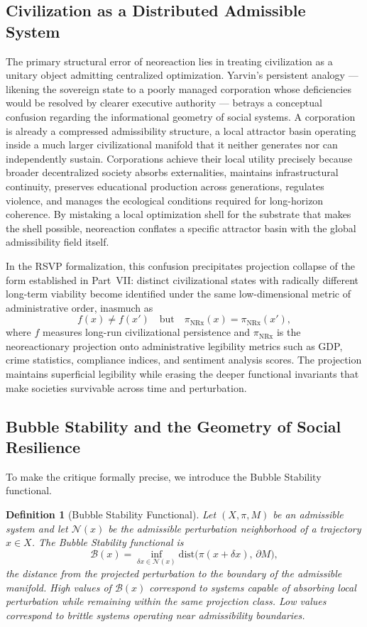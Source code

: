 \documentclass[12pt, a4paper]{article}
\theoremstyle{essaystyle}
\newtheorem{definition}{Definition}
\begin{document}
\subsection{Civilization as a Distributed Admissible System}

The primary structural error of neoreaction lies in treating civilization as a
unitary object admitting centralized optimization. Yarvin's persistent analogy ---
likening the sovereign state to a poorly managed corporation whose deficiencies
would be resolved by clearer executive authority --- betrays a conceptual confusion
regarding the informational geometry of social systems. A corporation is already
a compressed admissibility structure, a local attractor basin operating inside a
much larger civilizational manifold that it neither generates nor can independently
sustain. Corporations achieve their local utility precisely because broader
decentralized society absorbs externalities, maintains infrastructural continuity,
preserves educational production across generations, regulates violence, and manages
the ecological conditions required for long-horizon coherence. By mistaking a local
optimization shell for the substrate that makes the shell possible, neoreaction
conflates a specific attractor basin with the global admissibility field itself.

In the RSVP formalization, this confusion precipitates projection collapse of the
form established in Part~VII: distinct civilizational states with radically different
long-term viability become identified under the same low-dimensional metric of
administrative order, inasmuch as
\[
f(x) \neq f(x') \quad \text{but} \quad \pi_{\mathrm{NRx}}(x) = \pi_{\mathrm{NRx}}(x'),
\]
where $f$ measures long-run civilizational persistence and $\pi_{\mathrm{NRx}}$ is
the neoreactionary projection onto administrative legibility metrics such as GDP,
crime statistics, compliance indices, and sentiment analysis scores. The projection
maintains superficial legibility while erasing the deeper functional invariants
that make societies survivable across time and perturbation.

\subsection{Bubble Stability and the Geometry of Social Resilience}

To make the critique formally precise, we introduce the Bubble Stability functional.

\begin{definition}[Bubble Stability Functional]
Let $(X, \pi, M)$ be an admissible system and let $\mathcal{N}(x)$ be the admissible
perturbation neighborhood of a trajectory $x \in X$. The \emph{Bubble Stability
functional} is
\[
\mathcal{B}(x) = \inf_{\delta x \in \mathcal{N}(x)}
\mathrm{dist}\bigl(\pi(x + \delta x),\, \partial M\bigr),
\]
the distance from the projected perturbation to the boundary of the admissible
manifold. High values of $\mathcal{B}(x)$ correspond to systems capable of
absorbing local perturbation while remaining within the same projection class.
Low values correspond to brittle systems operating near admissibility boundaries.
\end{definition}
\end{document}
